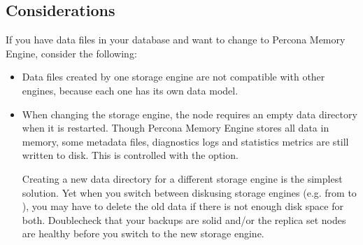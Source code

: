 \documentclass[letterpaper,10pt,english]{sphinxmanual}
\begin{document}
\subsection{Considerations}
\label{\detokenize{inmemory:considerations}}
\sphinxAtStartPar
If you have data files in your database and want to change to Percona Memory Engine, consider the following:
\begin{itemize}
\item {} 
\sphinxAtStartPar
Data files created by one storage engine are not compatible with other engines, because each one has its own data model.

\item {} 
\sphinxAtStartPar
When changing the storage engine, the  node requires an empty  data directory when it is restarted. Though Percona Memory Engine stores all data in memory, some metadata files, diagnostics logs and statistics metrics are still written to disk. This is controlled with the {\hyperref[\detokenize{inmemory:cmdoption-inMemoryStatisticsLogDelaySecs}]{}} option.

\sphinxAtStartPar
Creating a new  data directory for a different storage engine is the simplest solution. Yet when you switch between disk\sphinxhyphen{}using storage engines (e.g. from  to {\hyperref[\detokenize{inmemory:inmemory}]{}}), you may have to delete the old data if there is not enough disk space for both. Double\sphinxhyphen{}check that your backups are solid and/or the replica set nodes are healthy before you switch to the new storage engine.

\end{itemize}
\end{document}
